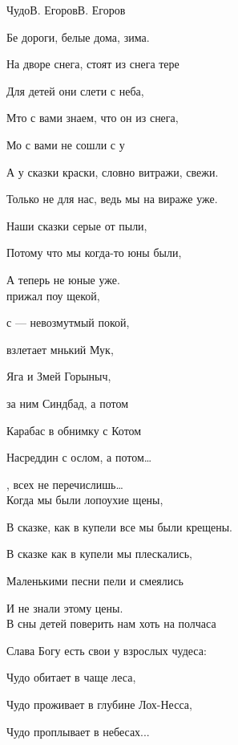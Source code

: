 \documentclass[11pt,a5paper]{book}
\renewcommand{\tt}{\indent \indent}
\begin{document}
\begin{song}{Чудо}{}{В. Егоров}{В. Егоров}{}{}

Бе дороги, белые дома, зима.\par
На дворе снега, стоят из снега тере\par                
Для детей они слети с неба,\par                             	
Мто с вами знаем, что он из снега,\par
Мо с вами не сошли с у\par
А у сказки краски, словно витражи, свежи.\par
Только не для нас, ведь мы на вираже уже.\par
Наши сказки серые от пыли,\par
Потому что мы когда-то юны были,\par
А теперь не юные уже.\\

 прижал поу щекой,\par
{} с — невозмутмый покой,\par
{} взлетает мнький Мук,\par
{}Яга и Змей Горыныч,\par
{} за ним Синдбад, а потом\par
{} Карабас в обнимку с Котом\par
{} Насреддин с ослом, а потом…\par
{}, всех не перечислишь…\\

Когда мы были лопоухие щены,\par
В сказке, как в купели все мы были крещены.\par
В сказке как в купели мы плескались,\par
Маленькими песни пели и смеялись\par
И не знали этому цены.\\

\newpage
В сны детей поверить нам хоть на полчаса\par
Слава Богу есть свои у взрослых чудеса:\par
Чудо обитает в чаще леса,\par
 Чудо проживает в глубине Лох-Несса,\par
Чудо проплывает в небесах...\\


\end{song}
\end{document}
